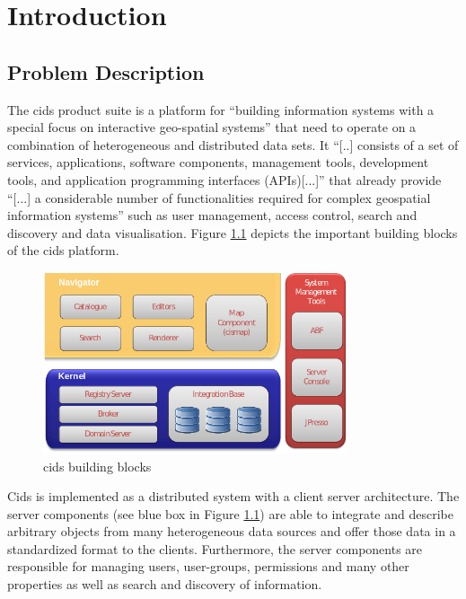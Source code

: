 \chapter{Introduction}\label{chap:intro}

\section{Problem Description} 

The cids product suite is a platform for ``building information systems with a special focus on interactive geo-spatial systems'' \autocite[]{cismet-cids-readMe} that need to operate on a combination of heterogeneous and distributed data sets.
 It ``[..] consists of a set of services, applications, software components, management tools, development tools, and application programming interfaces (APIs)[...]'' \autocite[]{cismet-cids-readMe} that already provide ``[...] a considerable number of functionalities required for complex geospatial information systems'' \autocite[]{cismet-cids-readMe} such as user management, access control, search and discovery and data visualisation.
 Figure \ref{fig:cids_building_blocks} depicts the important building blocks of the cids platform.


\begin{figure}
	\centering \includegraphics[width=0.8\textwidth]{./img/intro/cids_building_blocks.png}
	\caption{cids building blocks \autocite[]{cismet-cids-readMe}}
	\label{fig:cids_building_blocks}
\end{figure}

Cids is implemented as a distributed system with a client server architecture.
The server components (see blue box in Figure \ref{fig:cids_building_blocks}) are able  to integrate and describe arbitrary objects from many heterogeneous data sources and offer those data in a standardized format to the clients.
Furthermore, the server components are responsible for managing users, user-groups, permissions and many other properties as well as search and discovery of information.

